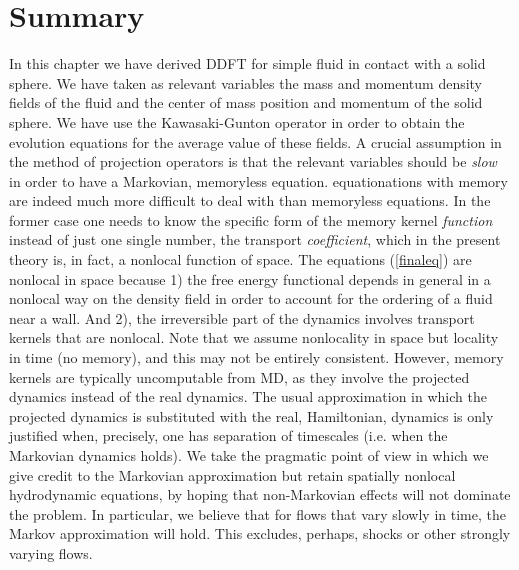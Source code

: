 \documentclass[b5paper,openright,10pt]{book}
\begin{document}
\section{Summary}
In this chapter we have derived DDFT for simple fluid in contact with a solid sphere. We have taken as relevant variables the mass and momentum density fields of the fluid and the center of mass position and momentum of the solid sphere. We have use the Kawasaki-Gunton operator in order to obtain the evolution equations for the average value of these fields.  
A crucial assumption in the method of projection operators is that the
relevant variables should be {\em slow}  in order to have a Markovian,
memoryless  equation.   equationations with  memory  are  indeed much  more
difficult to deal with than  memoryless equations.  In the former case
one  needs  to know  the  specific  form  of  the memory  kernel  {\em
  function}  instead of  just one  single number,  the transport  {\em
  coefficient}, which in  the present theory is, in  fact, a nonlocal
function  of space.   The equations  (\ref{finaleq}) are  nonlocal in
space because  1) the free energy  functional depends in general  in a
nonlocal  way on  the  density  field in  order  to  account for  the
ordering of a fluid near a wall.  And 2), the irreversible part of the
dynamics involves transport kernels that  are nonlocal.  Note that we
assume nonlocality  in space  but locality in  time (no  memory), and
this  may not  be entirely  consistent.  However,  memory kernels  are
typically uncomputable from MD, as they involve the projected dynamics
instead of  the real  dynamics. The usual  approximation in  which the
projected dynamics is substituted with the real, Hamiltonian, dynamics
is only justified  when, precisely, one has separation  of timescales
(i.e.   when the  Markovian dynamics  holds).  We  take the  pragmatic
point of view  in which we give credit to  the Markovian approximation
but retain spatially nonlocal  hydrodynamic equations, by hoping that
non-Markovian effects will not dominate the problem. In particular, we
believe  that  for  flows  that   vary  slowly  in  time,  the  Markov
approximation  will hold.   This  excludes, perhaps,  shocks or  other
strongly varying flows.
\end{document}

